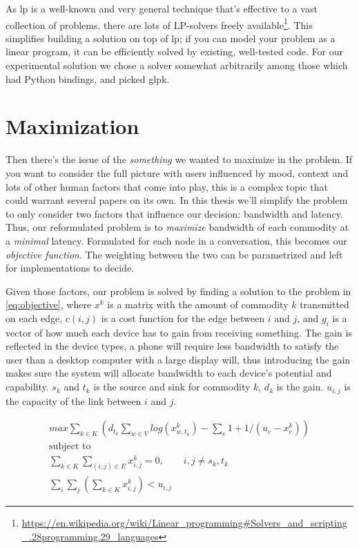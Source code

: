As \gls{lp} is a well-known and very general technique that's effective to a vast collection of problems, there are lots of LP-solvers freely available\footnote{\url{https://en.wikipedia.org/wiki/Linear_programming\#Solvers_and_scripting_.28programming.29_languages}}. This simplifies building a solution on top of \gls{lp}; if you can model your problem as a linear program, it can be efficiently solved by existing, well-tested code. For our experimental solution we chose a solver somewhat arbitrarily among those which had Python bindings, and picked \gls{glpk}.


\section{Maximization}

Then there's the issue of the \emph{something} we wanted to maximize in the problem. If you want to consider the full picture with users influenced by mood, context and lots of other human factors that come into play, this is a complex topic that could warrant several papers on its own. In this thesis we'll simplify the problem to only consider two factors that influence our decision: bandwidth and latency. Thus, our reformulated problem is to \emph{maximize} bandwidth of each commodity at a \emph{minimal} latency. Formulated for each node in a conversation, this becomes our \emph{objective function}. The weighting between the two can be parametrized and left for implementations to decide.

Given those factors, our problem is solved by finding a solution to the problem in \autoref{eq:objective}, where $x^k$ is a matrix with the amount of commodity $k$ transmitted on each edge, $c(i, j)$ is a cost function for the edge between $i$ and $j$, and $g_i$ is a vector of how much each device has to gain from receiving something. The gain is reflected in the device types, a phone will require less bandwidth to satisfy the user than a desktop computer with a large display will, thus introducing the gain makes sure the system will allocate bandwidth to each device's potential and capability. $s_k$ and $t_k$ is the source and sink for commodity $k$, $d_k$ is the gain. $u_{i, j}$ is the capacity of the link between $i$ and $j$.

\begin{gather}\label{eq:objective}
    max \sum_{k \in K} (d_{t_k} \sum_{w \in V} log(x_{w, t_k}^k) - \sum_e 1 + 1/(u_e - x_e^k))\\
    \text{subject to} \nonumber \\
    \sum_{k \in K} \sum_{(i, j) \in E} x_{i, j}^k = 0, \qquad{} i, j \neq s_k, t_k \label{eq:flow-conservation} \\
    \sum_i \sum_j (\sum_{k \in K}x_{i, j}^k) < u_{i, j} \label{eq:bwlim}
\end{gather}


